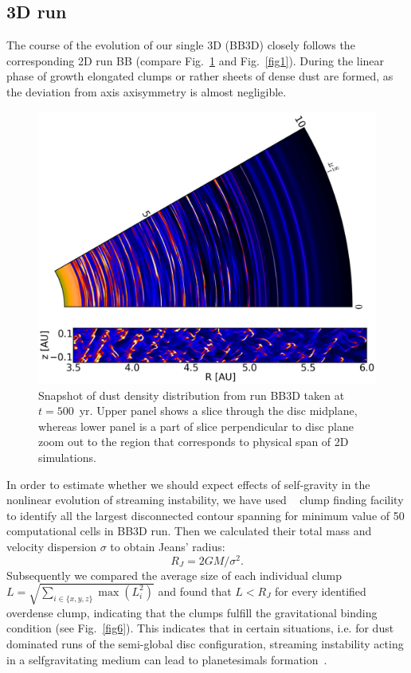 \subsection{3D run}
The course of the evolution of our single 3D (BB3D) closely follows the
corresponding 2D run BB (compare Fig.~\ref{fig5} and Fig.~\ref{fig1}). During
the linear phase of growth elongated clumps or rather sheets of dense dust are
formed, as the deviation from axis axisymmetry is almost negligible.
%
\begin{figure}
   \includegraphics[width=0.98\linewidth]{figures/fig5}
   \caption{Snapshot of dust density distribution from run BB3D taken at
   $t=500$~yr. Upper panel shows a slice through the disc midplane, whereas lower
   panel is a part of slice perpendicular to disc plane zoom out to the region
   that corresponds to physical span of 2D simulations.}
   \label{fig5}
\end{figure}
In order to estimate whether we should expect effects of self-gravity  in the
nonlinear evolution of streaming instability, we have used \yt{}~\citep{yt} clump
finding facility to identify all the largest disconnected contour spanning for
minimum value of 50 computational cells in BB3D run. Then we calculated their
total mass and velocity dispersion $\sigma$ to obtain Jeans' radius:
%
\begin{equation}
   R_J = 2 GM / \sigma^2.
\end{equation}
Subsequently we compared the average size of each individual clump $L =
\sqrt{\sum_{i\in{\{x,y,z\}}} \max (L_i^2)}$ and found that $L < R_J$ for every
identified overdense clump, indicating that the clumps fulfill the gravitational
binding condition (see Fig.~\ref{fig6}). This indicates that in certain
situations, i.e. for dust dominated runs of the semi-global disc configuration,
streaming instability acting in a selfgravitating medium can lead to planetesimals
formation~\citep{J07}.

